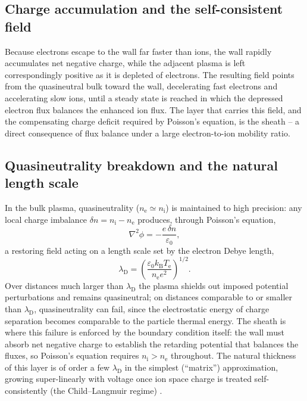 \subsection{Charge accumulation and the self-consistent field}

Because electrons escape to the wall far faster than ions, the wall rapidly accumulates net negative charge, while the adjacent plasma is left correspondingly positive as it is depleted of electrons. The resulting field points from the quasineutral bulk toward the wall, decelerating fast electrons and accelerating slow ions, until a steady state is reached in which the depressed electron flux balances the enhanced ion flux. The layer that carries this field, and the compensating charge deficit required by Poisson's equation, is the sheath -- a direct consequence of flux balance under a large electron-to-ion mobility ratio.

\subsection{Quasineutrality breakdown and the natural length scale}

In the bulk plasma, quasineutrality ($n_{\mathrm{e}} \simeq n_{\mathrm{i}}$) is maintained to high precision: any local charge imbalance $\delta n = n_{\mathrm{i}} - n_{\mathrm{e}}$ produces, through Poisson's equation,
\begin{equation}
\nabla^{2} \phi = -\frac{e\,\delta n}{\varepsilon_{0}},
\end{equation}
a restoring field acting on a length scale set by the electron Debye length,
\begin{equation}
\lambda_{\mathrm{D}} = \left( \frac{\varepsilon_{0} k_{\mathrm{B}} T_{\mathrm{e}}}{n_{\mathrm{e}} e^{2}} \right)^{1/2}.
\label{ch03-eq:debye-length}
\end{equation}
Over distances much larger than $\lambda_{\mathrm{D}}$ the plasma shields out imposed potential perturbations and remains quasineutral; on distances comparable to or smaller than $\lambda_{\mathrm{D}}$, quasineutrality can fail, since the electrostatic energy of charge separation becomes comparable to the particle thermal energy. The sheath is where this failure is enforced by the boundary condition itself: the wall must absorb net negative charge to establish the retarding potential that balances the fluxes, so Poisson's equation requires $n_{\mathrm{i}} > n_{\mathrm{e}}$ throughout. The natural thickness of this layer is of order a few $\lambda_{\mathrm{D}}$ in the simplest (``matrix'') approximation, growing super-linearly with voltage once ion space charge is treated self-consistently (the Child--Langmuir regime) \cite{ref0012,ref0024}.


